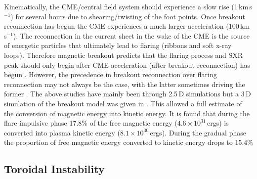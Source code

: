 Kinematically, the CME/central field system should experience a slow rise (1\,km\,s$^{-1}$) for several hours due to shearing/twisting of the foot points. Once breakout reconnection has begun the CME experiences a much larger acceleration (100\,km\,s$^{-1}$). The reconnection in the current sheet in the wake of the CME is the source of energetic particles that ultimately lead to flaring (ribbons and soft x-ray loops). Therefore magnetic breakout predicts that the flaring process and SXR peak should only begin after CME acceleration (after breakout reconnection) has begun \citep{lynch2004}. However, the precedence in breakout reconnection over flaring reconnection may not always be the case, with the latter sometimes driving the former \citep{macneice2004}. The above studies have mainly been through 2.5\,D simulations but a 3\,D simulation of the breakout model was given in \citep{lynch2008}. This allowed a full estimate of the conversion of magnetic energy into kinetic energy. It is found that during the flare impulsive phase 17.8\% of the free magnetic energy ($4.6\times10^{31}$\,ergs) is converted into plasma kinetic energy ($8.1\times10^{30}$\,ergs). During the gradual phase the proportion of free magnetic energy converted to kinetic energy drops to 15.4\%


\subsection{Toroidal Instability}\label{sec:ti_model}

